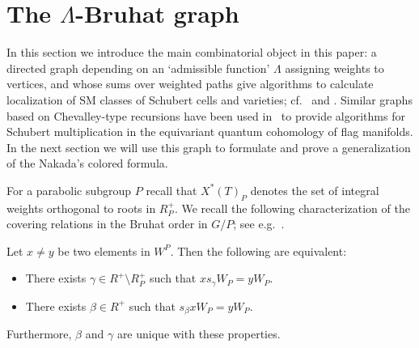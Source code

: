 \section{The \texorpdfstring{$\Lambda$}{Lambda}-Bruhat graph}
\label{sec:LambdaBruhat}
In this section we introduce the main combinatorial object in this paper: a directed graph depending on an `admissible function' $\Lambda$ assigning weights to vertices, and whose sums over weighted paths give algorithms to calculate
localization of SM classes of Schubert cells and varieties; cf.~  and .
Similar graphs based on Chevalley-type recursions have been used in~\cite{mihalcea:eqqgr,mihalcea:eqqhom,naruse2014schubert,naruse2019skew} to provide algorithms for Schubert multiplication in the equivariant quantum cohomology of flag manifolds. In the next section we will use this graph to formulate and prove a generalization of the Nakada's colored formula. 

For a parabolic subgroup $P$ recall that $X^*(T)_P$ denotes the set of integral weights orthogonal 
to roots in $R_P^+$. We recall the following
characterization of the covering relations in the Bruhat order in $G/P$; see e.g.~\cite[Lemma 4.1]{fulton.woodward}.
\begin{lemma}\label{lem:P}
	Let $x \neq y$ be two elements in $W^P$. Then the following are equivalent:
	
	\begin{itemize} \item[(a)] There exists $\gamma \in R^{+} \setminus R_P^+$ such that $x s_\gamma  W_P=y W_P$.
		
		\item[(b)] There exists $\beta \in R^+$
		such that $s_\beta x W_P=y W_P$.
	\end{itemize} 
	Furthermore, $\beta$ and $\gamma $ are unique with these properties.
\end{lemma} 

